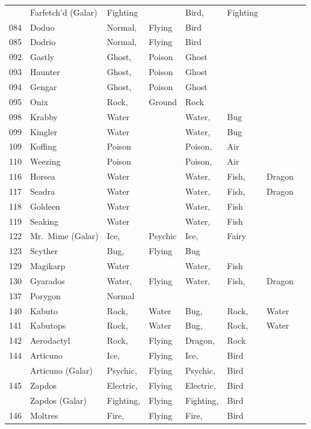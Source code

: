 \documentclass{article}
\begin{document}
\begin{longtable}{rl|ll|llll}
    & Farfetch'd (Galar) & Fighting &  & Bird, & Fighting &  &  \\
084 & Doduo & Normal, & Flying & Bird &  &  &  \\
085 & Dodrio & Normal, & Flying & Bird &  &  &  \\
092 & Gastly & Ghost, & Poison & Ghost &  &  &  \\
093 & Haunter & Ghost, & Poison & Ghost &  &  &  \\
094 & Gengar & Ghost, & Poison & Ghost &  &  &  \\
095 & Onix & Rock, & Ground & Rock &  &  &  \\
098 & Krabby & Water &  & Water, & Bug &  &  \\
099 & Kingler & Water &  & Water, & Bug &  &  \\
109 & Koffing & Poison &  & Poison, & Air &  &  \\
110 & Weezing & Poison &  & Poison, & Air &  &  \\
116 & Horsea & Water &  & Water, & Fish, & Dragon &  \\
117 & Seadra & Water &  & Water, & Fish, & Dragon &  \\
118 & Goldeen & Water &  & Water, & Fish &  &  \\
119 & Seaking & Water &  & Water, & Fish &  &  \\
122 & Mr.~Mime (Galar) & Ice, & Psychic & Ice, & Fairy &  &  \\
123 & Scyther & Bug, & Flying & Bug &  &  &  \\
129 & Magikarp & Water &  & Water, & Fish &  &  \\
130 & Gyarados & Water, & Flying & Water, & Fish, & Dragon &  \\
137 & Porygon & Normal &  &  &  &  &  \\
140 & Kabuto & Rock, & Water & Bug, & Rock, & Water &  \\
141 & Kabutops & Rock, & Water & Bug, & Rock, & Water &  \\
142 & Aerodactyl & Rock, & Flying & Dragon, & Rock &  &  \\
144 & Articuno & Ice, & Flying & Ice, & Bird &  &  \\
    & Articuno (Galar) & Psychic, & Flying & Psychic, & Bird &  &  \\
145 & Zapdos & Electric, & Flying & Electric, & Bird &  &  \\
    & Zapdos (Galar) & Fighting, & Flying & Fighting, & Bird &  &  \\
146 & Moltres & Fire, & Flying & Fire, & Bird &  &  \\

\end{longtable}
\end{document}
